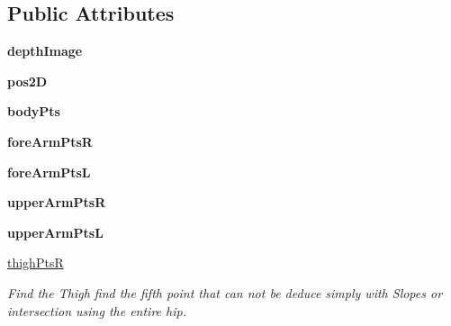 \subsection*{Public Attributes}
\begin{DoxyCompactItemize}
\item 
\mbox{\label{classsegmentation_1_1_segmentation_a36ea52b517559b5691e5bc72588b2701}} 
{\bfseries depth\+Image}
\item 
\mbox{\label{classsegmentation_1_1_segmentation_a354e16a494df339af336594c1e1844f0}} 
{\bfseries pos2D}
\item 
\mbox{\label{classsegmentation_1_1_segmentation_aacd82fcfebb0f0cd30f9e45c96f6394b}} 
{\bfseries body\+Pts}
\item 
\mbox{\label{classsegmentation_1_1_segmentation_a7302304f2b0c3d89af45c50aa33a828c}} 
{\bfseries fore\+Arm\+PtsR}
\item 
\mbox{\label{classsegmentation_1_1_segmentation_ad1a1f1e70672d02fff598618e147d0c8}} 
{\bfseries fore\+Arm\+PtsL}
\item 
\mbox{\label{classsegmentation_1_1_segmentation_af82bbe5af405d55ecf4b95f9bf13f395}} 
{\bfseries upper\+Arm\+PtsR}
\item 
\mbox{\label{classsegmentation_1_1_segmentation_acd5f5a3d2af4b3132a8c47a4f74464d7}} 
{\bfseries upper\+Arm\+PtsL}
\item 
\mbox{\label{classsegmentation_1_1_segmentation_ab687d252753954c9d8a532e5b098e637}} 
\hyperlink{classsegmentation_1_1_segmentation_ab687d252753954c9d8a532e5b098e637}{thigh\+PtsR}
\begin{DoxyCompactList}\small\item\em Find the Thigh find the fifth point that can not be deduce simply with Slopes or intersection using the entire hip. \end{DoxyCompactList}\item 
\mbox{\label{classsegmentation_1_1_segmentation_a32dde4e5585db094b44c3ab757f3ab9e}} 

\end{DoxyCompactItemize}
